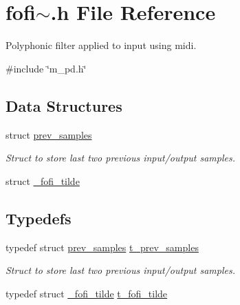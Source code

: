 \hypertarget{fofi~_8h}{}\section{fofi$\sim$.h File Reference}
\label{fofi~_8h}


Polyphonic filter applied to input using midi.  


{\ttfamily \#include \char`\"{}m\+\_\+pd.\+h\char`\"{}}\newline
\subsection*{Data Structures}
\begin{DoxyCompactItemize}
\item 
struct \mbox{\hyperlink{structprev__samples}{prev\+\_\+samples}}
\begin{DoxyCompactList}\small\item\em Struct to store last two previous input/output samples. \end{DoxyCompactList}\item 
struct \mbox{\hyperlink{struct__fofi__tilde}{\+\_\+fofi\+\_\+tilde}}
\end{DoxyCompactItemize}
\subsection*{Typedefs}
\begin{DoxyCompactItemize}
\item 
typedef struct \mbox{\hyperlink{structprev__samples}{prev\+\_\+samples}} \mbox{\hyperlink{fofi~_8h_a728138bbe23514a1927f1f686090cd52}{t\+\_\+prev\+\_\+samples}}
\begin{DoxyCompactList}\small\item\em Struct to store last two previous input/output samples. \end{DoxyCompactList}\item 
typedef struct \mbox{\hyperlink{struct__fofi__tilde}{\+\_\+fofi\+\_\+tilde}} \mbox{\hyperlink{fofi~_8h_a9d4d0a864b5185ebc589d41112da08ce}{t\+\_\+fofi\+\_\+tilde}}
\end{DoxyCompactItemize}
